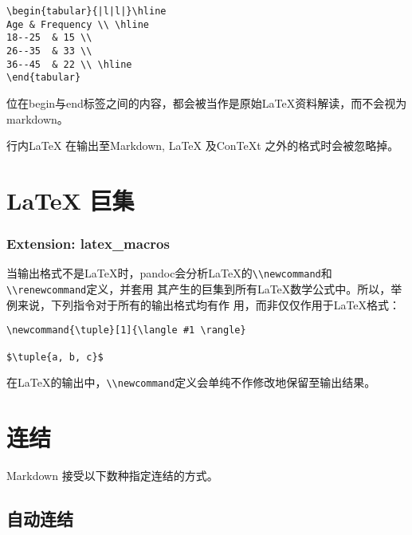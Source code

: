 \documentclass[fancyhdr,bookmark]{ctexbook}
\newcommand{\passthrough}[1]{#1}
\begin{document}
\begin{lstlisting}
\begin{tabular}{|l|l|}\hline
Age & Frequency \\ \hline
18--25  & 15 \\
26--35  & 33 \\
36--45  & 22 \\ \hline
\end{tabular}
\end{lstlisting}

位在begin与end标签之间的内容，都会被当作是原始LaTeX资料解读，而不会视为markdown。

行内LaTeX 在输出至Markdown, LaTeX 及ConTeXt 之外的格式时会被忽略掉。

\hypertarget{latex-ux5de8ux96c6}{%
\section{LaTeX 巨集}\label{latex-ux5de8ux96c6}}

\hypertarget{extension-latex_macros}{%
\subsubsection{Extension: latex\_macros}\label{extension-latex_macros}}

当输出格式不是LaTeX时，pandoc会分析LaTeX的\passthrough{\lstinline!\\newcommand!}和\passthrough{\lstinline!\\renewcommand!}定义，并套用
其产生的巨集到所有LaTeX数学公式中。所以，举例来说，下列指令对于所有的输出格式均有作
用，而非仅仅作用于LaTeX格式：

\begin{lstlisting}
\newcommand{\tuple}[1]{\langle #1 \rangle}

$\tuple{a, b, c}$
\end{lstlisting}

在LaTeX的输出中，\passthrough{\lstinline!\\newcommand!}定义会单纯不作修改地保留至输出结果。

\hypertarget{ux8fdeux7ed3}{%
\section{连结}\label{ux8fdeux7ed3}}

Markdown 接受以下数种指定连结的方式。

\hypertarget{ux81eaux52a8ux8fdeux7ed3}{%
\subsection{自动连结}\label{ux81eaux52a8ux8fdeux7ed3}}
\end{document}
